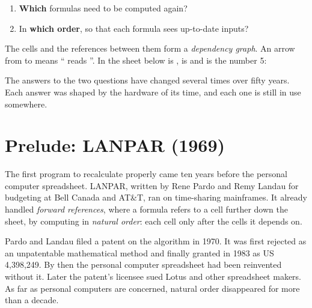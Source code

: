 \documentclass[11pt]{article}
\begin{document}
\begin{enumerate}[label=\arabic*.]
\item \textbf{Which} formulas need to be computed again?
\item In \textbf{which order}, so that each formula sees up-to-date inputs?
\end{enumerate}

The cells and the references between them form a \emph{dependency graph}.
An arrow from  to  means `` reads ''.
In the sheet below  is ,  is  and
 is the number 5:

\begin{center}
\end{center}

The answers to the two questions have changed several times over fifty
years. Each answer was shaped by the hardware of its time, and each one is
still in use somewhere.

\section{Prelude: LANPAR (1969)}

The first program to recalculate properly came ten years before the
personal computer spreadsheet. LANPAR, written by Rene Pardo and Remy
Landau for budgeting at Bell Canada and AT\&T, ran on time-sharing
mainframes. It already handled \emph{forward references}, where a formula
refers to a cell further down the sheet, by computing in \emph{natural
order}: each cell only after the cells it depends on.

Pardo and Landau filed a patent on the algorithm in 1970. It was first
rejected as an unpatentable mathematical method and finally granted in 1983
as US 4,398,249. By then the personal computer spreadsheet had been
reinvented without it. Later the patent's licensee sued Lotus and other
spreadsheet makers. As far as personal computers are concerned, natural
order disappeared for more than a decade.
\end{document}
